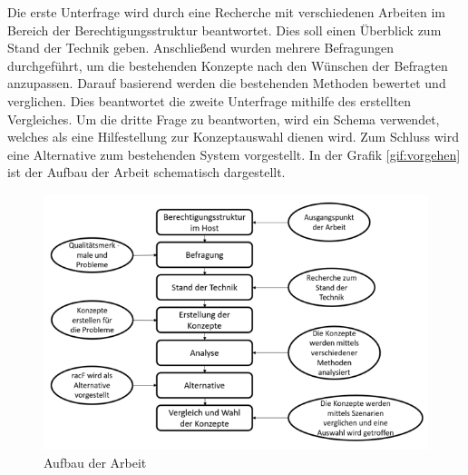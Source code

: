 Die erste Unterfrage wird durch eine Recherche mit verschiedenen Arbeiten im Bereich der Berechtigungsstruktur beantwortet.
Dies soll einen Überblick zum Stand der Technik geben.
Anschließend wurden mehrere Befragungen durchgeführt, um die bestehenden Konzepte nach den Wünschen der Befragten anzupassen.
Darauf basierend werden die bestehenden Methoden bewertet und verglichen.
Dies beantwortet die zweite Unterfrage mithilfe des erstellten Vergleiches.
\newline
Um die dritte Frage zu beantworten, wird ein Schema verwendet, welches als eine Hilfestellung zur Konzeptauswahl dienen wird.
Zum Schluss wird eine Alternative zum bestehenden System vorgestellt.
In der Grafik \ref{gif:vorgehen} ist der Aufbau der Arbeit schematisch dargestellt.
\newpage
\begin{figure}[h!]
\hspace*{-3cm}
 \centering
 \includegraphics[width=1.5\textwidth]{gfx/Picture/Vorgehen.PNG}
 \caption{Aufbau der Arbeit}
 \label{fig:vorgehen}
\end{figure}
\newpage
